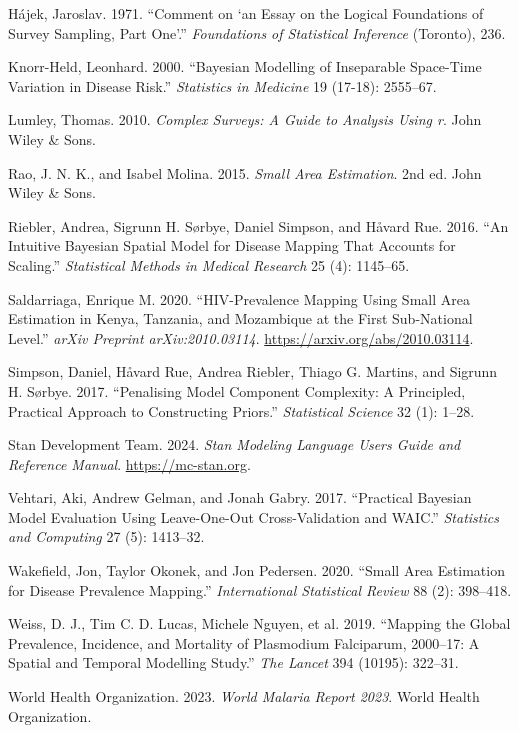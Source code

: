 \documentclass{article}
\newlength{\cslhangindent}
\newenvironment{CSLReferences}[2] %
 {\begin{list}{}{%
  \setlength{\itemindent}{0pt}
  \setlength{\leftmargin}{0pt}
  \setlength{\parsep}{0pt}
  \ifodd #1
   \setlength{\leftmargin}{\cslhangindent}
   \setlength{\itemindent}{-1\cslhangindent}
  \fi
  \setlength{\itemsep}{#2\baselineskip}}}
 {\end{list}}
\begin{document}
\begin{CSLReferences}{1}{1}
Hájek, Jaroslav. 1971. {``Comment on {`an Essay on the Logical
Foundations of Survey Sampling, Part One'}.''} \emph{Foundations of
Statistical Inference} (Toronto), 236.

Knorr-Held, Leonhard. 2000. {``Bayesian Modelling of Inseparable
Space-Time Variation in Disease Risk.''} \emph{Statistics in Medicine}
19 (17-18): 2555--67.

Lumley, Thomas. 2010. \emph{Complex Surveys: A Guide to Analysis Using
r}. John Wiley \& Sons.

Rao, J. N. K., and Isabel Molina. 2015. \emph{Small Area Estimation}.
2nd ed. John Wiley \& Sons.

Riebler, Andrea, Sigrunn H. Sørbye, Daniel Simpson, and Håvard Rue.
2016. {``An Intuitive Bayesian Spatial Model for Disease Mapping That
Accounts for Scaling.''} \emph{Statistical Methods in Medical Research}
25 (4): 1145--65.

Saldarriaga, Enrique M. 2020. {``HIV-Prevalence Mapping Using Small Area
Estimation in Kenya, Tanzania, and Mozambique at the First Sub-National
Level.''} \emph{arXiv Preprint arXiv:2010.03114}.
\url{https://arxiv.org/abs/2010.03114}.

Simpson, Daniel, Håvard Rue, Andrea Riebler, Thiago G. Martins, and
Sigrunn H. Sørbye. 2017. {``Penalising Model Component Complexity: A
Principled, Practical Approach to Constructing Priors.''}
\emph{Statistical Science} 32 (1): 1--28.

Stan Development Team. 2024. \emph{Stan Modeling Language Users Guide
and Reference Manual}. \url{https://mc-stan.org}.

Vehtari, Aki, Andrew Gelman, and Jonah Gabry. 2017. {``Practical
Bayesian Model Evaluation Using Leave-One-Out Cross-Validation and
WAIC.''} \emph{Statistics and Computing} 27 (5): 1413--32.

Wakefield, Jon, Taylor Okonek, and Jon Pedersen. 2020. {``Small Area
Estimation for Disease Prevalence Mapping.''} \emph{International
Statistical Review} 88 (2): 398--418.

{Weiss, D. J., Tim C. D. Lucas, Michele Nguyen, et al.} 2019. {``Mapping
the Global Prevalence, Incidence, and Mortality of Plasmodium
Falciparum, 2000--17: A Spatial and Temporal Modelling Study.''}
\emph{The Lancet} 394 (10195): 322--31.

World Health Organization. 2023. \emph{World Malaria Report 2023}. World
Health Organization.

\end{CSLReferences}



\end{document}

